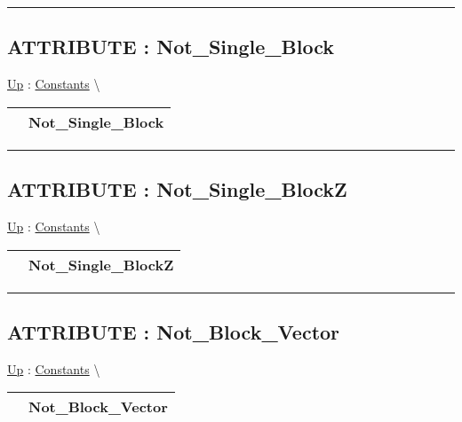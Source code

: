 \par


\rule{\linewidth}{0.5pt}
\subsection*{ATTRIBUTE : Not\_Single\_Block}
\hypertarget{ecldoc:pbblas.constants.not_single_block}{}
\hyperlink{ecldoc:PBblas.Constants}{Up} :
\hspace{0pt} \hyperlink{ecldoc:PBblas.Constants}{Constants} \textbackslash 

{\renewcommand{\arraystretch}{1.5}
\begin{tabularx}{\textwidth}{|>{\raggedright\arraybackslash}l|X|}
\hline
\hspace{0pt} & Not\_Single\_Block \\
\hline
\end{tabularx}
}

\par


\rule{\linewidth}{0.5pt}
\subsection*{ATTRIBUTE : Not\_Single\_BlockZ}
\hypertarget{ecldoc:pbblas.constants.not_single_blockz}{}
\hyperlink{ecldoc:PBblas.Constants}{Up} :
\hspace{0pt} \hyperlink{ecldoc:PBblas.Constants}{Constants} \textbackslash 

{\renewcommand{\arraystretch}{1.5}
\begin{tabularx}{\textwidth}{|>{\raggedright\arraybackslash}l|X|}
\hline
\hspace{0pt} & Not\_Single\_BlockZ \\
\hline
\end{tabularx}
}

\par


\rule{\linewidth}{0.5pt}
\subsection*{ATTRIBUTE : Not\_Block\_Vector}
\hypertarget{ecldoc:pbblas.constants.not_block_vector}{}
\hyperlink{ecldoc:PBblas.Constants}{Up} :
\hspace{0pt} \hyperlink{ecldoc:PBblas.Constants}{Constants} \textbackslash 

{\renewcommand{\arraystretch}{1.5}
\begin{tabularx}{\textwidth}{|>{\raggedright\arraybackslash}l|X|}
\hline
\hspace{0pt} & Not\_Block\_Vector \\
\hline
\end{tabularx}
}

